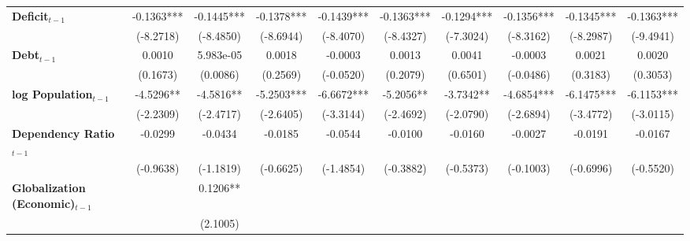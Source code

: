 \begin{center}
\begin{tabular}{lccccccccc}
\textbf{Deficit$_{t-1}$}             &     -0.1363***     &     -0.1445***     &     -0.1378***     &     -0.1439***     &     -0.1363***     &     -0.1294***     &     -0.1356***     &     -0.1345***     &     -0.1363***      \\
\textbf{ }                         &     (-8.2718)      &     (-8.4850)      &     (-8.6944)      &     (-8.4070)      &     (-8.4327)      &     (-7.3024)      &     (-8.3162)      &     (-8.2987)      &     (-9.4941)       \\
\textbf{Debt$_{t-1}$}                &       0.0010       &     5.983e-05      &       0.0018       &      -0.0003       &       0.0013       &       0.0041       &      -0.0003       &       0.0021       &       0.0020        \\
\textbf{ }                         &      (0.1673)      &      (0.0086)      &      (0.2569)      &     (-0.0520)      &      (0.2079)      &      (0.6501)      &     (-0.0486)      &      (0.3183)      &      (0.3053)       \\
\textbf{log Population$_{t-1}$}      &     -4.5296**      &     -4.5816**      &     -5.2503***     &     -6.6672***     &     -5.2056**      &     -3.7342**      &     -4.6854***     &     -6.1475***     &     -6.1153***      \\
\textbf{ }                         &     (-2.2309)      &     (-2.4717)      &     (-2.6405)      &     (-3.3144)      &     (-2.4692)      &     (-2.0790)      &     (-2.6894)      &     (-3.4772)      &     (-3.0115)       \\
\textbf{Dependency Ratio$_{t-1}$}   &      -0.0299       &      -0.0434       &      -0.0185       &      -0.0544       &      -0.0100       &      -0.0160       &      -0.0027       &      -0.0191       &      -0.0167        \\
\textbf{ }                         &     (-0.9638)      &     (-1.1819)      &     (-0.6625)      &     (-1.4854)      &     (-0.3882)      &     (-0.5373)      &     (-0.1003)      &     (-0.6996)      &     (-0.5520)       \\
\textbf{Globalization (Economic)$_{t-1}$}             &                    &      0.1206**      &                    &                    &                    &                    &                    &                    &                     \\
\textbf{ }                         &                    &      (2.1005)      &                    &                    &                    &                    &                    &                    &                     \\

\end{tabular}
\end{center}
